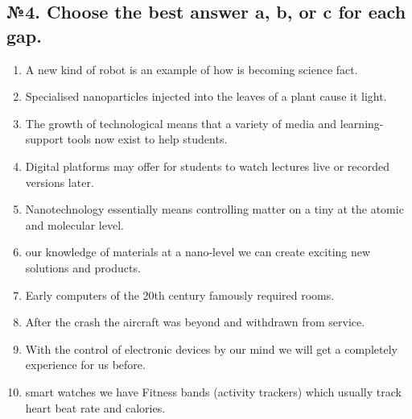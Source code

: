 \subsection*{№4. Choose the best answer a, b, or c for each gap.}
\begin{enumerate}
      \item A new kind of robot is an example of how \underline{\hspace{2cm}} is becoming science fact.
      \item Specialised nanoparticles injected into the leaves of a plant cause it \underline{\hspace{2cm}} light.
      \item The growth of technological \underline{\hspace{2cm}} means that a variety of media and learning-support tools now exist to help students.
      \item Digital platforms may offer \underline{\hspace{2cm}} for students to watch lectures live or recorded versions later.
      \item Nanotechnology essentially means controlling matter on a tiny \underline{\hspace{2cm}} at the atomic and molecular level.
      \item \underline{\hspace{2cm}} our knowledge of materials at a nano-level we can create exciting new solutions and products.
      \item Early computers of the 20th century famously required \underline{\hspace{2cm}} rooms.
      \item After the crash the aircraft was \underline{\hspace{2cm}} beyond \underline{\hspace{2cm}} and withdrawn from service.
      \item With the control of electronic devices by our mind we will get a completely \underline{\hspace{2cm}} experience for us before.
      \item \underline{\hspace{2cm}} smart watches we have Fitness bands (activity trackers) which usually track heart beat rate and calories.
\end{enumerate}

